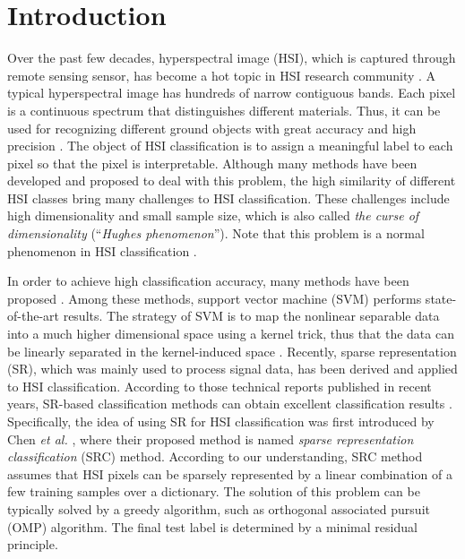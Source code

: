 \documentclass{ws-ijwmip}
\begin{document}
\section{Introduction}
Over the past few decades, hyperspectral image (HSI), which is captured through remote sensing sensor, 
has become a hot topic in HSI research community \cite{3}.
A typical hyperspectral image has hundreds of narrow contiguous bands. 
Each pixel is a continuous spectrum that distinguishes different materials. 
Thus, it can be used for recognizing different ground objects with great accuracy and high precision \cite{1,2,4}. 
The object of HSI classification is to assign a meaningful label to each pixel so that the pixel is interpretable.
Although many methods have been developed and proposed to deal with this problem, 
the high similarity of different HSI classes bring many challenges to HSI classification.   
These challenges include high dimensionality and small sample size, which is also called \textit{the curse of dimensionality} (``\textit{Hughes phenomenon}''). 
Note that this problem is a normal phenomenon in HSI classification \cite{5}.

In order to achieve high classification accuracy, many methods have been proposed \cite{6}. 
Among these methods, support vector machine (SVM) performs state-of-the-art results. 
The strategy of SVM is to map the nonlinear separable data into a much higher dimensional space using a kernel trick, thus that the data can be linearly separated in the kernel-induced space \cite{7,8,9}.
Recently, sparse representation (SR), which was mainly used to process signal data, has been derived and applied to  
HSI classification. 
According to those technical reports published in recent years, SR-based classification methods can obtain excellent classification results \cite{13,14,15,16,17}.
Specifically, the idea of using SR for HSI classification was first introduced by Chen {\it et al.} \cite{18}, where their proposed method is named \emph{sparse representation classification} (SRC) method.
According to our understanding, SRC method assumes that HSI pixels can be sparsely represented by a linear combination of a few training samples over a dictionary. 
The solution of this problem can be typically solved by a greedy algorithm, such as orthogonal associated pursuit (OMP) algorithm. 
The final test label is determined by a minimal residual principle.
\end{document}
